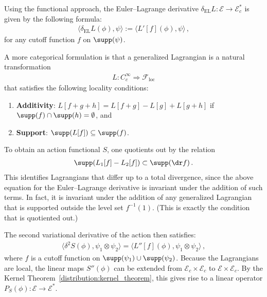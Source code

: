     Using the functional approach, the Euler--Lagrange derivative $\delta_{\text{EL}}L:\mathcal{E}\rightarrow\mathcal{E}^*_c$ is given by the following formula:
    \begin{gather}
        \langle\delta_{\text{EL}}L(\phi),\psi\rangle := \langle L'[f](\phi),\psi \rangle\,,
    \end{gather}
    for any cutoff function $f$ on $\supp(\psi)$.
    \begin{remark}[Functoriality]
        A more categorical formulation is that a generalized Lagrangian is a natural transformation
        \begin{gather}
            L:C^\infty_c\Rightarrow\mathcal{F}_\text{loc}
        \end{gather}
        that satisfies the following locality conditions:
        \begin{enumerate}
            \item\textbf{Additivity}: $L[f+g+h] = L[f+g]-L[g]+L[g+h]$ if $\supp(f)\cap\supp(h)=\emptyset$, and
            \item\textbf{Support}: $\supp(L[f])\subseteq\supp(f)$.
        \end{enumerate}
        To obtain an action functional $S$, one quotients out by the relation
        \begin{gather}
            \supp(L_1[f]-L_2[f])\subset\supp(\dr f)\,.
        \end{gather}
        This identifies Lagrangians that differ up to a total divergence, since the above equation for the Euler--Lagrange derivative is invariant under the addition of such terms. In fact, it is invariant under the addition of any generalized Lagrangian that is supported outside the level set $f^{-1}(1)$. (This is exactly the condition that is quotiented out.)
    \end{remark}

    The second variational derivative of the action then satisfies:
    \begin{gather}
        \langle\delta^2S(\phi),\psi_1\otimes\psi_2 \rangle = \langle L''[f](\phi),\psi_1\otimes\psi_2 \rangle\,,
    \end{gather}
    where $f$ is a cutoff function on $\supp(\psi_1)\cup\supp(\psi_2)$. Because the Lagrangians are local, the linear maps $S''(\phi)$ can be extended from $\mathcal{E}_c\times\mathcal{E}_c$ to $\mathcal{E}\times\mathcal{E}_c$. By the Kernel Theorem~\ref{distribution:kernel_theorem}, this gives rise to a linear operator $P_S(\phi):\mathcal{E}\rightarrow\mathcal{E}^*$.

